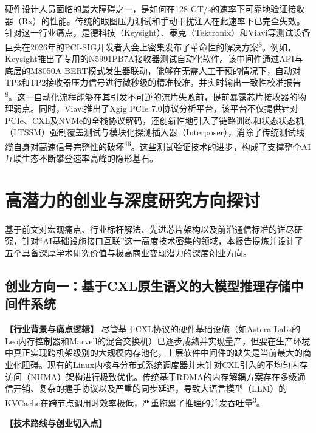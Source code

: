 硬件设计人员面临的最大障碍之一，是如何在128 GT/s的速率下可靠地验证接收器（Rx）的性能。传统的眼图压力测试和手动干扰注入在此速率下已完全失效。针对这一行业痛点，是德科技（Keysight）、泰克（Tektronix）和Viavi等测试设备巨头在2026年的PCI-SIG开发者大会上密集发布了革命性的解决方案\textsuperscript{8}。例如，Keysight推出了专用的N5991PB7A接收器测试自动化软件。该中间件通过API与底层的M8050A BERT模式发生器联动，能够在无需人工干预的情况下，自动对TP3和TP2接收器压力信号进行微秒级的精准校准，并实时输出一致性校准报告\textsuperscript{8}。这一自动化流程能够在其引发不可逆的流片失败前，提前暴露芯片接收器的物理弱点。同时，Viavi推出了Xgig PCIe 7.0协议分析平台，该平台不仅提供针对PCIe、CXL及NVMe的全栈协议解码，还创新性地引入了链路训练和状态状态机（LTSSM）强制覆盖测试与模块化探测插入器（Interposer），消除了传统测试线缆自身对高速信号完整性的破坏\textsuperscript{46}。这些测试验证技术的进步，构成了支撑整个AI互联生态不断攀登速率高峰的隐形基石。

\section{高潜力的创业与深度研究方向探讨}

基于前文对宏观痛点、行业标杆解法、先进芯片架构以及前沿通信标准的详尽研究，针对``AI基础设施接口互联''这一高度技术密集的领域，本报告提炼并设计了五个具备深厚学术研究价值与极高商业变现潜力的深度创业方向。

\subsection{创业方向一：基于CXL原生语义的大模型推理存储中间件系统}

\textbf{【行业背景与痛点逻辑】} 尽管基于CXL协议的硬件基础设施（如Astera Labs的Leo内存控制器和Marvell的混合交换机）已逐步成熟并实现量产，但要在生产环境中真正实现跨机架级别的大规模内存池化，上层软件中间件的缺失是当前最大的商业化阻碍。现有的Linux内核与分布式系统调度器并未针对CXL引入的不均匀内存访问（NUMA）架构进行极致优化。传统基于RDMA的内存解耦方案存在多级通信开销、复杂的握手协议以及严重的同步延迟，导致大语言模型（LLM）的KVCache在跨节点调用时效率极低，严重拖累了推理的并发吞吐量\textsuperscript{3}。

\textbf{【技术路线与创业切入点】}

